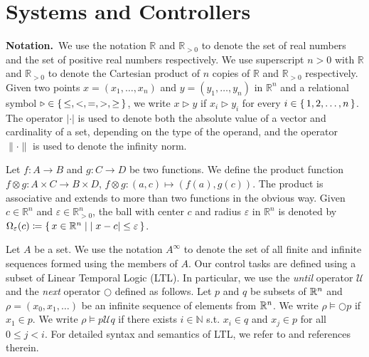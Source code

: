 
\section{Systems and Controllers}

\smallskip
\noindent\textbf{Notation.}\
We use the notation $\mathbb{R}$ and $\mathbb{R}_{>0}$ to denote the set of real numbers and the set of positive real numbers respectively.
We use superscript $n>0$ with $\mathbb{R}$ and $\mathbb{R}_{>0}$ to denote the Cartesian product of $n$ copies of $\mathbb{R}$ and $\mathbb{R}_{>0}$ respectively.
Given two points $x=(x_1,\ldots, x_n)$ and $y=(y_1,\ldots, y_n)$ in $ \mathbb{R}^n$
and a relational symbol $\triangleright\in \set{\leq, <, = , >, \geq}$, we write $x\triangleright y$ if $x_i\triangleright y_i$ for every $i\in\set{1,2,\ldots,n}$.
The operator $|\cdot |$ is used to denote both the absolute value of a vector and cardinality of a set, depending on the type of the operand, and the operator $\| \cdot \|$ is used to denote the infinity norm.  

Let $f\colon A\to B$ and $g\colon C\to D$ be two functions.
We define the product function $f\otimes g\colon A\times C\to B\times D $, $f\otimes g \colon (a,c)\mapsto (f(a),g(c))$.
The product is associative and extends to more than two functions in the obvious way.
%
Given $c\in \mathbb{R}^n$ and $\varepsilon\in \mathbb{R}_{>0}^{n}$, the ball with center $c$ and radius $\varepsilon$ in $\mathbb{R}^n$ is denoted by 
$\Omega_\varepsilon(c)\coloneqq \set{x \in \mathbb{R}^n \mid  |x-c|\leq \varepsilon }$.

Let $A$ be a set.
We use the notation $A^\infty$ to denote the set of all finite and infinite sequences formed using the members of $A$. Our control tasks are defined using a subset of Linear Temporal Logic (LTL). 
In particular, we use the \emph{until} operator $\mathcal{U}$ and the \emph{next} operator $\bigcirc$ defined as follows. 
Let $p$ and $q$ be subsets of $\mathbb{R}^n$ and $\rho=(x_0,x_1,\dots)$ be an infinite sequence of elements from $\mathbb{R}^n$. 
We write $\rho\models\bigcirc p$ if $x_1\in p$. We write $\rho\models p\mathcal{U}q$ if there exists 
$i\in\mathbb{N}$ s.t. $x_i\in q$ and $x_j\in p$ for all $0\leq j<i$. 
For detailed syntax and semantics of LTL, we refer to \cite{baier2008principles} and references therein.


